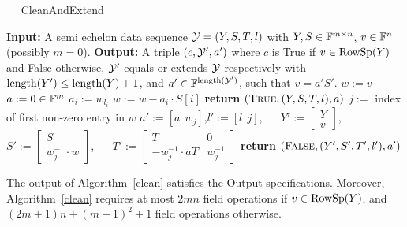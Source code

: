 \begin{algorithm}
\caption{$\quad$ \sc CleanAndExtend}
%
\label{clean}
\begin{algorithmic}
\STATE \textbf{Input:} A semi echelon data sequence $\mathcal{Y}=(Y,S,T,l)$ with 
         $Y,S \in \mathbb{F}^{m \times n}$, $v \in \mathbb{F}^n$ (possibly $m=0$).
\STATE \textbf{Output:} A triple $(c,\mathcal{Y}',a')$ where $c$ is {\sc True} 
if $v \in \mathrm{RowSp}(Y)$ and {\sc False} otherwise, $\mathcal{Y}'$ equals or 
extends $\mathcal{Y}$ respectively with $\mathrm{length}(Y') \le \mathrm{length}(Y)+1$, 
and $a'\in\mathbb{F}^{\mathrm{length} (\mathcal{Y}')}$, such that $v = a'S'$.
\vspace*{2mm}
\STATE $w := v$
\STATE $a := 0 \in \mathbb{F}^m$
    \STATE $a_i := w_{l_i}$
    \STATE $w := w - a_i \cdot S[i]$
\ENDFOR\hspace*{6mm}
    \STATE \textbf{return} $(\mbox{\sc True},(Y,S,T,l),a)$
\ELSE
    \STATE $j := $ index of first non-zero entry in $w$
    \STATE $a' := [ a \ \ w_j ]$,\quad $l' := \left[ l \ \ j \right]$, $\quad$
    \STATE $Y' := \left[ 
       \begin{array}{c} Y \\ v \end{array} \right]$, $\quad$
           $S' := \left[ 
       \begin{array}{c} S \\ w_j^{-1} \cdot w \end{array} \right]$, $\quad$
           $T' := \left[ 
       \begin{array}{cc} T & 0 \\ -w_j^{-1}\cdot aT & w_j^{-1} 
       \end{array} \right]$
    \STATE \textbf{return} $(\mbox{\sc False}, (Y',S',T',l'), a' )$
\ENDIF
\end{algorithmic}
\end{algorithm}

\begin{Prop}
%
The output of Algorithm~\ref{clean} satisfies the Output
specifications.
Moreover, Algorithm~\ref{clean} requires at most $2mn$ field operations
if $v\in\mathrm{RowSp}(Y)$, and
$(2m+1)n + (m+1)^2 + 1$ field operations otherwise.
\end{Prop}

